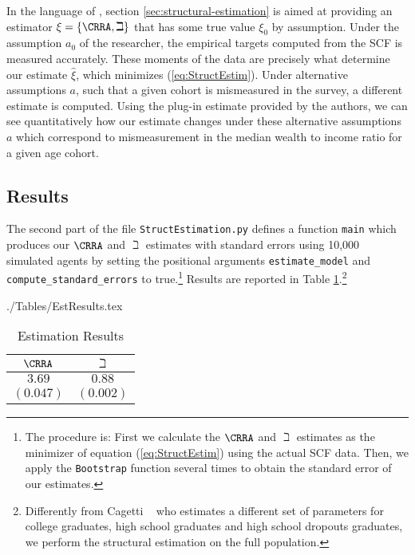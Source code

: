 \documentclass[\econtexRoot/SolvingMicroDSOPs]{subfiles}
\begin{document}
In the language of \cite{andrews2017measuring}, section \ref{sec:structural-estimation} is aimed at providing an estimator $\xi =\{\CRRA ,\beth\}$ that has some true value $\xi_0 $ by assumption. Under the assumption $a_0$ of the researcher, the empirical targets computed from the SCF is measured accurately. These moments of the data are precisely what determine our estimate $\hat{\xi}$, which minimizes (\ref{eq:StructEstim}). Under alternative assumptions $a$, such that a given cohort is mismeasured in the survey, a different estimate is computed. Using the plug-in estimate provided by the authors, we can see quantitatively how our estimate changes under these alternative assumptions $a$ which correspond to mismeasurement in the median wealth to income ratio for a given age cohort.

\subsection{Results}
The second part of the file \texttt{StructEstimation.py}
defines a function \texttt{main} which produces our $\CRRA$ and
$\beth$ estimates with standard errors using 10,000 simulated
agents by setting the positional arguments \texttt{estimate\_model} and
\texttt{compute\_standard\_errors} to true.\footnote{The procedure is: First we calculate the $\CRRA$ and
  $\beth$ estimates as the minimizer of equation
  (\ref{eq:StructEstim}) using the actual SCF data. Then, we apply the
  \texttt{Bootstrap} function several times to obtain the standard
  error of our estimates.} Results are reported in Table
\ref{tab:EstResults}.\footnote{Differently from Cagetti
  ~\citeyearpar{cagettiWprofiles} who estimates a different set of
  parameters for college graduates, high school graduates and high
  school dropouts graduates, we perform the structural estimation on
  the full population.}


\begin{verbatimwrite}{./Tables/EstResults.tex}
  \begin{table}[h]
    \caption{Estimation Results}\label{tab:EstResults}
    \center
    \begin{tabular}{cc}
      \hline
      $\CRRA $ & $\beth$\\
      \hline
      $3.69$ & $0.88$\\
      $(0.047)$ & $(0.002)$\\
      \hline
    \end{tabular}
  \end{table}
\end{verbatimwrite} \unskip
\unskip
\end{document}
